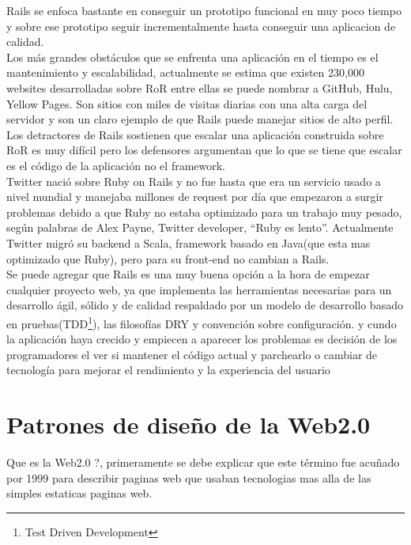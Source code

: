     Rails se enfoca bastante en conseguir un prototipo funcional en muy poco tiempo 
    y sobre ese prototipo seguir incrementalmente hasta conseguir una aplicacion 
    de calidad.\\

    Los más grandes obstáculos que se enfrenta una aplicación en el tiempo es el 
    mantenimiento y escalabilidad, actualmente se estima que existen 230,000 websites\cite{web2} 
    desarrolladas sobre RoR %
    entre ellas se puede nombrar a GitHub, Hulu, Yellow Pages. Son sitios con miles de visitas diarias
    con una alta carga del servidor y son un claro ejemplo de que Rails puede manejar sitios de alto perfil.\\

    Los detractores de Rails sostienen que escalar una aplicación construida 
    sobre RoR es muy difícil pero los defensores argumentan que lo que se 
    tiene que escalar es el código de la aplicación no el framework.\\

    Twitter nació sobre Ruby on  Rails  y no fue hasta que era un servicio usado 
    a nivel mundial y manejaba millones de request por día que empezaron a surgir 
    problemas debido a que Ruby no estaba optimizado para un trabajo muy pesado, 
    según palabras de Alex Payne, Twitter developer, “Ruby es lento”\cite{web3}. 
    Actualmente Twitter migró su backend a Scala, framework basado en Java(que esta mas optimizado que Ruby),
    pero para su front-end no cambian a Rails.\cite{web4}\\
    
    Se puede agregar que Rails es una muy buena opción a la hora de empezar 
    cualquier proyecto web, ya que implementa las herramientas necesarias 
    para un desarrollo ágil, sólido y de calidad respaldado por un modelo 
    de desarrollo basado en pruebas(TDD\footnote{Test Driven Development}), las filosofías DRY y convención sobre configuración.
    y cundo la aplicaci\'on haya crecido y empiecen a aparecer los problemas es 
    decisión de los programadores el ver si mantener el código actual y parchearlo o 
    cambiar de tecnología para mejorar el rendimiento y la experiencia del usuario\\

  \section{Patrones de diseño de la Web2.0} %
  \label{sec:patrones_web20}
    Que es la Web2.0 ?,  primeramente  se debe explicar que este término fue acuñado 
    por 1999 para describir paginas web que usaban tecnologias mas alla de las 
    simples estaticas paginas web.
    
